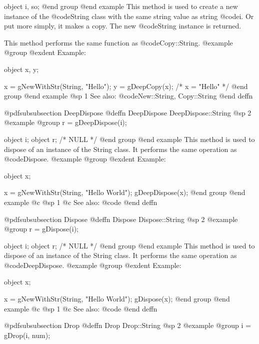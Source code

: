 object  i, so;
@end group
@end example
This method is used to create a new instance of the @code{String} class
with the same string value as string @code{i}.  Or put more simply,
it makes a copy.  The new @code{String} instance is returned.

This method performs the same function as @code{Copy::String}.
@example
@group
@exdent Example:

object  x, y;

x = gNewWithStr(String, "Hello");
y = gDeepCopy(x);
/*  x = "Hello"  */
@end group
@end example
@sp 1
See also:  @code{New::String, Copy::String}
@end deffn







@pdfsubsubsection {DeepDispose}
@deffn {DeepDispose} DeepDispose::String
@sp 2
@example
@group
r = gDeepDispose(i);

object  i;
object  r;     /*  NULL  */
@end group
@end example
This method is used to dispose of an instance of the String class.
It performs the same operation as @code{Dispose}.
@example
@group
@exdent Example:

object  x;

x = gNewWithStr(String, "Hello World");
gDeepDispose(x);
@end group
@end example
@c @sp 1
@c See also:  @code{}
@end deffn








@pdfsubsubsection {Dispose}
@deffn {Dispose} Dispose::String
@sp 2
@example
@group
r = gDispose(i);

object  i;
object  r;     /*  NULL  */
@end group
@end example
This method is used to dispose of an instance of the String class.
It performs the same operation as @code{DeepDispose}.
@example
@group
@exdent Example:

object  x;

x = gNewWithStr(String, "Hello World");
gDispose(x);
@end group
@end example
@c @sp 1
@c See also:  @code{}
@end deffn


















@pdfsubsubsection {Drop}
@deffn {Drop} Drop::String
@sp 2
@example
@group
i = gDrop(i, num);

